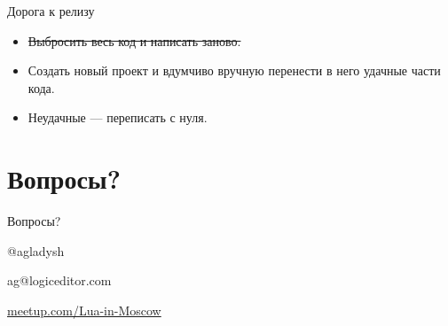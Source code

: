 \documentclass[aspectratio=169,handout,bigger]{beamer}
\newcommand{\soutt}[1]{%
    \renewcommand{\ULthickness}{1pt}%
       \sout{#1}%
    \renewcommand{\ULthickness}{.4pt}%
}
\begin{document}

\begin{frame}{Дорога к релизу}
  \begin{itemize}
    \item \soutt{Выбросить весь код и написать заново.}
    \item Создать новый проект и вдумчиво вручную
          перенести в него удачные части кода.
    \item Неудачные --- переписать с нуля.
  \end{itemize}
\end{frame}


\section{Вопросы?}

\begin{frame}[plain]{Вопросы?}

\begin{center}
\Huge{@agladysh}
\end{center}

\begin{center}
\Large{ag@logiceditor.com}
\end{center}

\begin{center}
\href{http://meetup.com/Lua-in-Moscow}{meetup.com/Lua-in-Moscow}
\end{center}

\end{frame}

\end{document}
